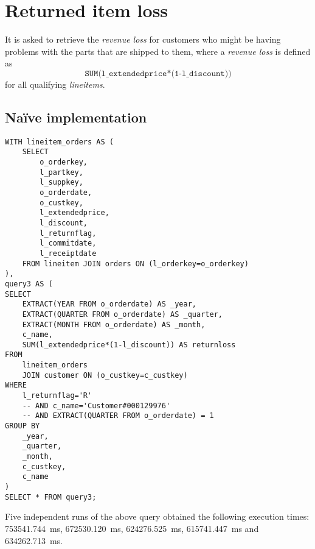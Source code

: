 

\section{Returned item loss}

It is asked to retrieve the \textit{revenue loss} for customers who might be having problems with the parts that are shipped to them, where a \textit{revenue loss} is defined as
$$ \texttt{SUM(l\_extendedprice*(1-l\_discount))}$$
for all qualifying \textit{lineitems}.

\subsection{Na\"{i}ve implementation}

\begin{lstlisting}
WITH lineitem_orders AS (
	SELECT 
		o_orderkey, 
		l_partkey, 
		l_suppkey, 
		o_orderdate, 
		o_custkey, 
		l_extendedprice, 
		l_discount, 
		l_returnflag,
		l_commitdate,
		l_receiptdate
	FROM lineitem JOIN orders ON (l_orderkey=o_orderkey)
),
query3 AS (
SELECT
	EXTRACT(YEAR FROM o_orderdate) AS _year,
	EXTRACT(QUARTER FROM o_orderdate) AS _quarter,
	EXTRACT(MONTH FROM o_orderdate) AS _month,
	c_name,
	SUM(l_extendedprice*(1-l_discount)) AS returnloss
FROM
	lineitem_orders
	JOIN customer ON (o_custkey=c_custkey)
WHERE 
	l_returnflag='R'
	-- AND c_name='Customer#000129976'
	-- AND EXTRACT(QUARTER FROM o_orderdate) = 1
GROUP BY
	_year,
	_quarter,
	_month,
	c_custkey,
	c_name
)
SELECT * FROM query3;
\end{lstlisting}

Five independent runs of the above query obtained the following execution times: \SI{753541.744}{\milli\s}, \SI{672530.120}{\milli\s}, \SI{624276.525}{\milli\s}, \SI{615741.447}{\milli\s} and \SI{634262.713}{\milli\s}.

